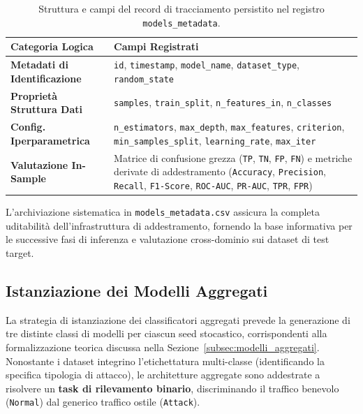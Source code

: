 \begin{table}[H]
    \centering
    \small
    \caption{Struttura e campi del record di tracciamento persistito nel registro \texttt{models\_metadata}.}
    \label{tab:models_metadata_schema}
    \begin{tabularx}{\textwidth}{>{\raggedright\arraybackslash}p{5cm} >{\raggedright\arraybackslash}X}
        \toprule
        \textbf{Categoria Logica} & \textbf{Campi Registrati} \\
        \midrule
        \textbf{Metadati di Identificazione} & 
        \texttt{id}, \texttt{timestamp}, \texttt{model\_name}, \texttt{dataset\_type}, \texttt{random\_state} \\
        \textbf{Proprietà Struttura Dati} & 
        \texttt{samples}, \texttt{train\_split}, \texttt{n\_features\_in}, \texttt{n\_classes} \\
        \textbf{Config. Iperparametrica} & 
        \texttt{n\_estimators}, \texttt{max\_depth}, \texttt{max\_features}, \texttt{criterion}, \texttt{min\_samples\_split}, \texttt{learning\_rate}, \texttt{max\_iter} \\
        \textbf{Valutazione In-Sample} & 
        Matrice di confusione grezza (\texttt{TP}, \texttt{TN}, \texttt{FP}, \texttt{FN}) e metriche derivate di addestramento (\texttt{Accuracy}, \texttt{Precision}, \texttt{Recall}, \texttt{F1-Score}, \texttt{ROC-AUC}, \texttt{PR-AUC}, \texttt{TPR}, \texttt{FPR}) \\
        \bottomrule
    \end{tabularx}
\end{table}

L'archiviazione sistematica in \texttt{models\_metadata.csv} assicura la completa uditabilità dell'infrastruttura di addestramento, fornendo la base informativa per le successive fasi di inferenza e valutazione cross-dominio sui dataset di test target.

\subsection{Istanziazione dei Modelli Aggregati}
\label{subsec:istanziazione_aggregati}

La strategia di istanziazione dei classificatori aggregati prevede la generazione di tre distinte classi di modelli per ciascun seed stocastico, corrispondenti alla formalizzazione teorica discussa nella Sezione~\ref{subsec:modelli_aggregati}. 
Nonostante i dataset integrino l'etichettatura multi-classe (identificando la specifica tipologia di attacco), le architetture aggregate sono addestrate a risolvere un \textbf{task di rilevamento binario}, discriminando il traffico benevolo (\texttt{Normal}) dal generico traffico ostile (\texttt{Attack}).

